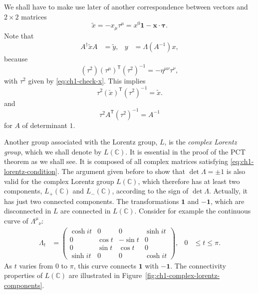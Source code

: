 We shall have to make use later of another correspondence between vectors and
$2\times2$ matrices
\begin{equation}
  \widetilde{x}
  =-x_\mu\tau^\mu
  =x^0\mathbf{1}-\mathbf{x}\mathbin{\cdot}\boldsymbol{\tau}.
  \tag{1-16}\label{eq:ch1-tilde-x}
\end{equation}
Note that
\begin{equation}
\begin{aligned}
  A^\dagger\widetilde{x}A&=\widetilde{y},
  & y&=\Lambda(A^{-1})x,
\end{aligned}
  \tag{1-17}\label{eq:ch1-sl2-tilde-action}
\end{equation}
because
\[
  (\tau^2)(\tau^\mu)^{\mathsf T}(\tau^2)^{-1}
  =-\eta^{\mu\nu}\tau^\nu,
\]
with $\tau^2$ given by \eqref{eq:ch1-check-x}. This implies
\[
  \tau^2(\check{x})^{\mathsf T}(\tau^2)^{-1}=\widetilde{x}.
\]
and
\begin{equation}
  \tau^2 A^{\mathsf T}(\tau^2)^{-1}=A^{-1}
  \tag{1-18}\label{eq:ch1-sl2-inverse}
\end{equation}
for $A$ of determinant $1$.

Another group associated with the Lorentz group, $L$, is the
\emph{complex Lorentz group}, which we shall denote by $L(\mathbb C)$. It is
essential in the proof of the $\mathrm{PCT}$ theorem as we shall see. It is
composed of all complex matrices satisfying \eqref{eq:ch1-lorentz-condition}. The argument given before
to show that $\det\Lambda=\pm1$ is also valid for the complex Lorentz group
$L(\mathbb C)$, which therefore has at least two components,
$L_+(\mathbb C)$ and $L_-(\mathbb C)$, according to the sign of $\det\Lambda$.
Actually, it has just two connected
components. The transformations $\mathbf{1}$ and $-\mathbf{1}$, which are
disconnected in $L$ are connected in $L(\mathbb C)$. Consider for example the
continuous curve of $\Lambda^\mu{}_\nu$:
\[
\begin{aligned}
  \Lambda_t&=
  \begin{pmatrix}
    \cosh it&0&0&\sinh it\\
    0&\cos t&-\sin t&0\\
    0&\sin t&\cos t&0\\
    \sinh it&0&0&\cosh it
  \end{pmatrix},
  & 0&\leq t\leq\pi .
\end{aligned}
\]
As $t$ varies from $0$ to $\pi$, this curve connects $\mathbf{1}$ with
$-\mathbf{1}$. The connectivity properties of $L(\mathbb C)$ are illustrated
in Figure~\ref{fig:ch1-complex-lorentz-components}.

